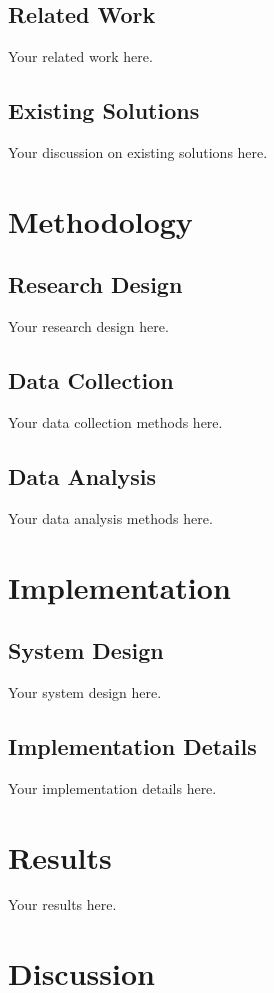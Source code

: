 \documentclass[12pt,a4paper]{report}
\begin{document}
\section{Related Work}
Your related work here.

\section{Existing Solutions}
Your discussion on existing solutions here.

\chapter{Methodology}
\section{Research Design}
Your research design here.

\section{Data Collection}
Your data collection methods here.

\section{Data Analysis}
Your data analysis methods here.

\chapter{Implementation}
\section{System Design}
Your system design here.

\section{Implementation Details}
Your implementation details here.

\chapter{Results}
Your results here.

\chapter{Discussion}
\end{document}
